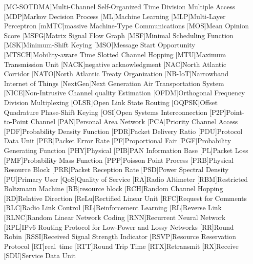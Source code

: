 \begin{acronym}
[MC-SOTDMA]{Multi-Channel Self-Organized Time Division Multiple Access}
[MDP]{Markov Decision Process}
[ML]{Machine Learning}
[MLP]{Multi-Layer Perceptron}
[mMTC]{massive Machine-Type Communications}
[MOS]{Mean Opinion Score}
[MSFG]{Matrix Signal Flow Graph}
[MSF]{Minimal Scheduling Function}
[MSK]{Minimum-Shift Keying}
[MSO]{Message Start Opportunity}
[MTSCH]{Mobility-aware Time Slotted Channel Hopping}
[MTU]{Maximum Transmission Unit}
[NACK]{negative acknowledgment}
[NAC]{North Atlantic Corridor}
[NATO]{North Atlantic Treaty Organization}
[NB-IoT]{Narrowband Internet of Things}
[NextGen]{Next Generation Air Transportation System}
[NICE]{Non-Intrusive Channel quality Estimation}
[OFDM]{Orthogonal Frequency Division Multiplexing}
[OLSR]{Open Link State Routing}
[OQPSK]{Offset Quadrature Phase-Shift Keying}
[OSI]{Open Systems Interconnection}
[P2P]{Point-to-Point Channel}
[PAN]{Personal Area Network}
[PCA]{Priority Channel Access}
[PDF]{Probability Density Function}
[PDR]{Packet Delivery Ratio}
[PDU]{Protocol Data Unit}
[PER]{Packet Error Rate}
[PF]{Proportional Fair}
[PGF]{Probability Generating Function}
[PHY]{Physical}
[PIB]{PAN Information Base}
[PL]{Packet Loss}
[PMF]{Probability Mass Function}
[PPP]{Poisson Point Process}
[PRB]{Physical Resource Block}
[PRR]{Packet Reception Rate}
[PSD]{Power Spectral Density}
[PU]{Primary User}
[QoS]{Quality of Service}
[RA]{Radio Altimeter}
[RBM]{Restricted Boltzmann Machine}
[RB]{resource block}
[RCH]{Random Channel Hopping}
[RD]{Relative Direction}
[ReLu]{Rectified Linear Unit}
[RFC]{Request for Comments}
[RLC]{Radio Link Control}
[RL]{Reinforcement Learning}
[RL]{Reverse Link}
[RLNC]{Random Linear Network Coding}
[RNN]{Recurrent Neural Network}
[RPL]{IPv6 Routing Protocol for Low-Power and Lossy Networks}
[RR]{Round Robin} 
[RSSI]{Received Signal Strength Indicator}
[RSVP]{Resource Reservation Protocol}
[RT]{real~time}
[RTT]{Round Trip Time}
[RTX]{Retransmit}
[RX]{Receive}
[SDU]{Service Data Unit}

\end{acronym}
